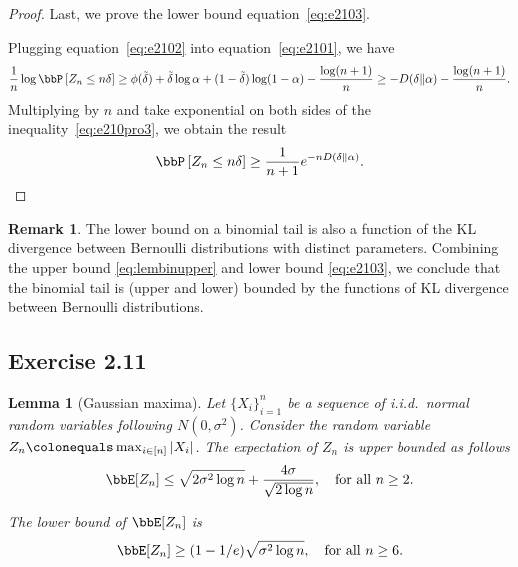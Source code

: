 \documentclass[11pt]{article}
\newcommand{\off}[1]{\left[#1\right]}
\theoremstyle{plain}
\newtheorem{lem}{Lemma}
\theoremstyle{definition}
\newtheorem{rmk}{Remark}
\begin{document}
\begin{proof}
	\vspace{0.2cm}
	Last, we prove the lower bound equation~\eqref{eq:e2103}.
	
	\vspace{0.2cm}
	Plugging equation~\eqref{eq:e2102} into equation~\eqref{eq:e2101}, we have
	\begin{equation}\label{eq:e210pro3}
		\frac{1}{n} \log \bbP \off{Z_n \leq n\delta} \geq \phi(\tilde \delta) + \tilde \delta \log \alpha + (1 - \tilde \delta ) \log (1-\alpha) - \frac{\log(n+1)}{n} \geq -D(\delta \Vert \alpha ) - \frac{\log(n+1)}{n}.
	\end{equation}
	Multiplying by $n$ and take exponential on both sides of the inequality~\eqref{eq:e210pro3}, we obtain the result
	\begin{equation}
		\bbP \off{Z_n \leq n\delta} \geq \frac{1}{n+1} e^{-nD(\delta \Vert \alpha)}.
	\end{equation}
\end{proof}

\begin{rmk}
	The lower bound on a binomial tail is also a function of the KL divergence between Bernoulli distributions with distinct parameters. Combining the upper bound \eqref{eq:lembinupper} and lower bound \eqref{eq:e2103}, we conclude that the binomial tail is (upper and lower) bounded by the functions of  KL divergence between Bernoulli distributions.
\end{rmk}


\subsection{Exercise 2.11}\label{Gausmax}
\begin{lem}[Gaussian maxima]
Let $\{X_i\}_{i=1}^n$ be a sequence of i.i.d.\ normal random variables following $N(0,\sigma^2)$. Consider the random variable $Z_n \colonequals \max_{i\in[n]} |X_i|$. The expectation of $Z_n$ is upper bounded as follows
\begin{equation}\label{eq:e2111}
	\bbE[Z_n] \leq \sqrt{2 \sigma^2 \log n} + \frac{4\sigma}{\sqrt{2 \log n}}, \quad \text{for all } n\geq 2.
\end{equation}

The lower bound of $\bbE[Z_n] $ is
\begin{equation}\label{eq:e2112}
	\bbE[Z_n] \geq (1- 1/e) \sqrt{\sigma^2 \log n} , \quad \text{for all }n \geq 6.
\end{equation}
\end{lem}
\end{document}
